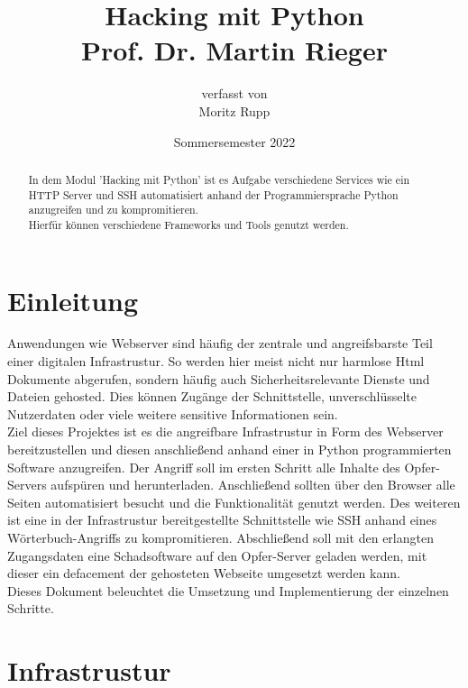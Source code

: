 \documentclass[12pt]{article}
\title{ Hacking mit Python\\\vspace{3mm}\small{ Prof. Dr. Martin Rieger}}
\author{ \small{verfasst von}\\ Moritz Rupp}
\date{Sommersemester 2022}
\begin{document}
\maketitle
\newpage
\tableofcontents
\newpage

\begin{abstract}
\noindent In dem Modul 'Hacking mit Python' ist es Aufgabe verschiedene Services wie ein HTTP Server und SSH automatisiert anhand der Programmiersprache Python anzugreifen und zu kompromitieren.\\ Hierfür können verschiedene Frameworks und Tools genutzt werden. 
\end{abstract}

\section{Einleitung}
Anwendungen wie Webserver sind häufig der zentrale und angreifsbarste Teil einer digitalen Infrastrustur. So werden hier meist nicht nur harmlose Html Dokumente abgerufen, sondern häufig auch Sicherheitsrelevante Dienste und Dateien gehosted. Dies können Zugänge der Schnittstelle, unverschlüsselte Nutzerdaten oder viele weitere sensitive Informationen sein.
\\
Ziel dieses Projektes ist es die angreifbare Infrastrustur in Form des Webserver bereitzustellen und diesen anschließend anhand einer in Python programmierten Software anzugreifen.
Der Angriff soll im ersten Schritt alle Inhalte des Opfer-Servers aufspüren und herunterladen. Anschließend sollten über den Browser alle Seiten automatisiert besucht und die Funktionalität genutzt werden.
Des weiteren ist eine in der Infrastrustur bereitgestellte Schnittstelle wie SSH anhand eines Wörterbuch-Angriffs zu kompromitieren. Abschließend soll mit den erlangten Zugangsdaten eine Schadsoftware auf den Opfer-Server geladen werden, mit dieser ein defacement der gehosteten Webseite umgesetzt werden kann.\\
Dieses Dokument beleuchtet die Umsetzung und Implementierung der einzelnen Schritte. 

\newpage
\section{Infrastrustur}
\end{document}
